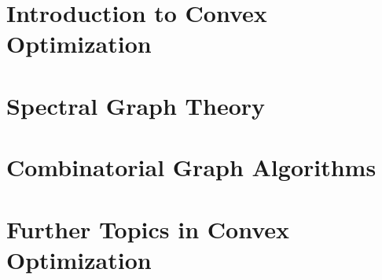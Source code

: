 \documentclass[12pt,a4paper,openany]{book}
\begin{document}
\newpage

\tableofcontents

\label{part:intro}


\part{Introduction to Convex Optimization}
\label{part:convex}




 \part{Spectral Graph Theory}
 \label{part:sg}
 
 
 
% 






 \part{Combinatorial Graph Algorithms}
 \label{part:combinatorial}
 
 
% 

\part{Further Topics in Convex Optimization}
\label{part:more}




% 
% 



\end{document}
